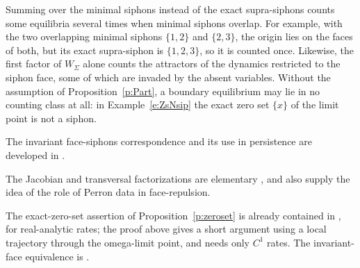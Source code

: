 Summing over the minimal siphons instead of the exact supra-siphons counts some
equilibria several times when minimal siphons overlap. For example, with the
two overlapping minimal siphons $\{1,2\}$ and $\{2,3\}$, the origin lies on the
faces of both, but its exact supra-siphon is $\{1,2,3\}$, so it is counted once.
Likewise, the first factor of $W_\Sigma$ alone counts the attractors of the dynamics
restricted to the siphon face, some of which are invaded by the absent
variables. Without the assumption of Proposition~\ref{p:Part}, a boundary
equilibrium may lie in no counting class at all: in
Example~\ref{e:ZsNsip} the exact zero set $\{x\}$ of the limit point is not a
siphon.
\eeR
{}
\fi



The invariant face-siphons correspondence and its use in persistence are developed in
\cite{AdLS,ShiuStu}.

The Jacobian and transversal factorizations are  elementary \cite{AAHK}, \cite{AAH26} and also supply
the idea of the role of Perron data in face-repulsion.

The exact-zero-set assertion of Proposition~\ref{p:zeroset} is already contained
in \cite[Lemma~5.3 and Proposition~5.4]{AdLS}, for real-analytic rates; the proof above gives a
short argument using a local trajectory through the omega-limit point, and needs only $C^1$ rates.
The invariant-face equivalence is \cite[Proposition~5.5]{AdLS}.
\eeR 